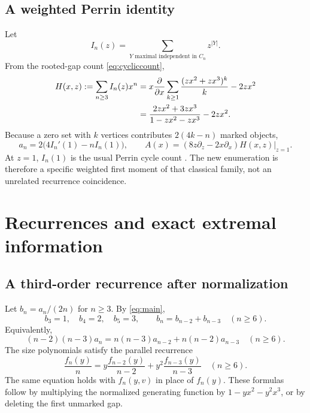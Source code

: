 \documentclass[11pt,letterpaper]{article}
\numberwithin{equation}{section}
\theoremstyle{definition}
\newcommand{\1}{\mathbf 1}
\begin{document}
\subsection{A weighted Perrin identity}
Let
\[
 I_n(z)=\sum_{Y\text{ maximal independent in }C_n}z^{|Y|}.
\]
From the rooted-gap count \eqref{eq:cycliccount},
\begin{align}\label{eq:perringf}
 H(x,z):=\sum_{n\ge3}I_n(z)x^n
 &=x\frac{\partial}{\partial x}\sum_{k\ge1}
       \frac{(zx^2+zx^3)^k}{k}-2zx^2\\
 &=\frac{2zx^2+3zx^3}{1-zx^2-zx^3}-2zx^2.\notag
\end{align}
Because a zero set with $k$ vertices contributes $2(4k-n)$ marked objects,
\begin{equation}\label{eq:perrinweighted}
 a_n=2\bigl(4I_n'(1)-nI_n(1)\bigr),\qquad
 A(x)=\left.(8z\partial_z-2x\partial_x)H(x,z)\right|_{z=1}.
\end{equation}
At $z=1$, $I_n(1)$ is the usual Perrin cycle count \cite{A001608}.
The new enumeration is therefore a specific weighted first moment of that
classical family, not an unrelated recurrence coincidence.

\section{Recurrences and exact extremal information}\label{sec:recurrences}

\subsection{A third-order recurrence after normalization}
Let $b_n=a_n/(2n)$ for $n\ge3$. By \eqref{eq:main},
\begin{equation}\label{eq:bnrec}
 b_3=1,\quad b_4=2,\quad b_5=3,\qquad
 b_n=b_{n-2}+b_{n-3}\quad(n\ge6).
\end{equation}
Equivalently,
\begin{equation}\label{eq:anpolyrec}
 (n-2)(n-3)a_n
 =n(n-3)a_{n-2}+n(n-2)a_{n-3}\quad(n\ge6).
\end{equation}
The size polynomials satisfy the parallel recurrence
\begin{equation}\label{eq:fnrec}
 \frac{f_n(y)}n
 =y\frac{f_{n-2}(y)}{n-2}
  +y^2\frac{f_{n-3}(y)}{n-3}\quad(n\ge6).
\end{equation}
The same equation holds with $f_n(y,v)$ in place of $f_n(y)$.
These formulas follow by multiplying the normalized generating function by
$1-yx^2-y^2x^3$, or by deleting the first unmarked gap.
\end{document}
